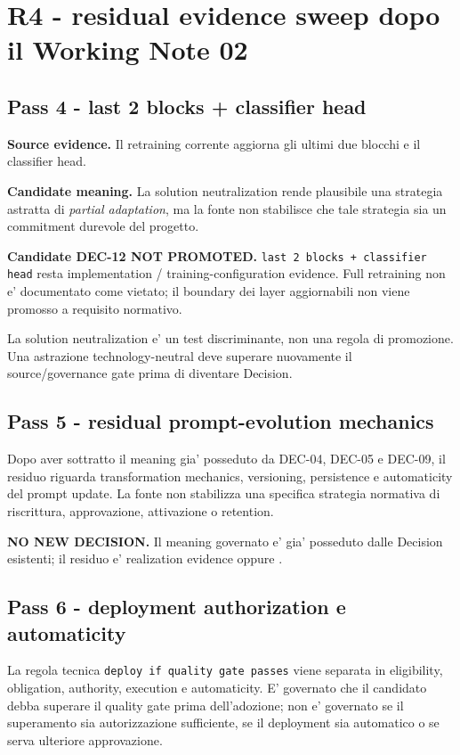 \documentclass[11pt,a4paper]{article}
\begin{document}
\clearpage
\section{R4 - residual evidence sweep dopo il Working Note 02}
\subsection{Pass 4 - last 2 blocks + classifier head}
\textbf{Source evidence.} Il retraining corrente aggiorna gli ultimi due blocchi e il classifier head.

\textbf{Candidate meaning.} La solution neutralization rende plausibile una strategia astratta di \emph{partial adaptation}, ma la fonte non stabilisce che tale strategia sia un commitment durevole del progetto.

\begin{ddtacore}[title={Disposition}]
\textbf{Candidate DEC-12 NOT PROMOTED.} \texttt{last 2 blocks + classifier head} resta implementation / training-configuration evidence. Full retraining non e' documentato come vietato; il boundary dei layer aggiornabili non viene promosso a requisito normativo.
\end{ddtacore}

\begin{ddtaprinciple}[title={Methodology feedback}]
La solution neutralization e' un test discriminante, non una regola di promozione. Una astrazione technology-neutral deve superare nuovamente il source/governance gate prima di diventare Decision.
\end{ddtaprinciple}

\subsection{Pass 5 - residual prompt-evolution mechanics}
Dopo aver sottratto il meaning gia' posseduto da DEC-04, DEC-05 e DEC-09, il residuo riguarda transformation mechanics, versioning, persistence e automaticity del prompt update. La fonte non stabilizza una specifica strategia normativa di riscrittura, approvazione, attivazione o retention.

\begin{ddtacore}[title={Disposition}]
\textbf{NO NEW DECISION.} Il meaning governato e' gia' posseduto dalle Decision esistenti; il residuo e' realization evidence oppure \NS.
\end{ddtacore}

\subsection{Pass 6 - deployment authorization e automaticity}
La regola tecnica \texttt{deploy if quality gate passes} viene separata in eligibility, obligation, authority, execution e automaticity. E' governato che il candidato debba superare il quality gate prima dell'adozione; non e' governato se il superamento sia autorizzazione sufficiente, se il deployment sia automatico o se serva ulteriore approvazione.
\end{document}
